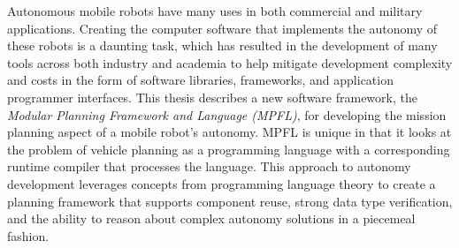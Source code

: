 
\abstract
Autonomous mobile robots have many uses in both commercial and military applications. Creating the computer software that implements the autonomy of these robots is a daunting task, which has resulted in the development of many tools across both industry and academia to help mitigate development complexity and costs in the form of software libraries, frameworks, and application programmer interfaces. This thesis describes a new software framework, the \textit{Modular Planning Framework and Language (MPFL)}, for developing the mission planning aspect of a mobile robot's autonomy. MPFL is unique in that it looks at the problem of vehicle planning as a programming language with a corresponding runtime compiler that processes the language. This approach to autonomy development leverages concepts from programming language theory to create a planning framework that supports component reuse, strong data type verification, and the ability to reason about complex autonomy solutions in a piecemeal fashion.